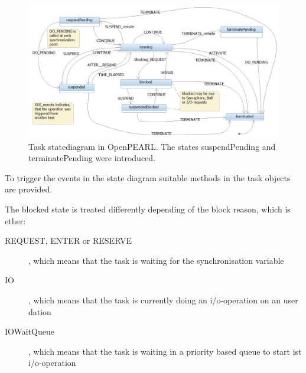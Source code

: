 \begin{figure}[bpht]
\includegraphics[width=14cm]{taskStatesOpenPEARL.jpg}
\caption{Task statediagram in OpenPEARL.
The states suspendPending and terminatePending were introduced.}
\label{taskStatesOpenPEARL}
\end{figure}
To trigger the events in the state diagram suitable methods in the task 
objects are provided. 

The blocked state is treated differently depending of the block reason, which
is ether:
\begin{description}
\item[REQUEST, ENTER or RESERVE], which means that the task is waiting for 
   the synchronisation variable
\item[IO], which means that the task is currently doing an i/o-operation
   on an user dation
\item[IOWaitQueue], which means that the task is waiting in a priority based
   queue to start ist i/o-operation
\end{description}

